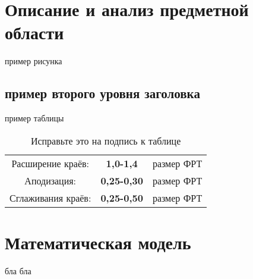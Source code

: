 \section{Описание и анализ предметной области}
пример рисунка
\subsection{пример второго уровня заголовка}
пример таблицы 
\begin{table}[H]
\caption{Исправьте это на подпись к таблице}
\label{tabular:timesandtenses}
\begin{center}
\begin{tabular}{ccc}
Расширение краёв: & \textbf{1,0-1,4} & размер ФРТ \\
Аподизация: & \textbf{0,25-0,30} & размер ФРТ \\
Сглаживания краёв: & \textbf{0,25-0,50}& размер ФРТ \\
\end{tabular}
\end{center}
\end{table}
\section{Математическая модель}
бла бла 

\pagebreak